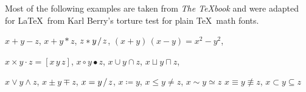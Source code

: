 \documentclass[11pt, a4paper, oneside]{article}
\newcommand*{\divslash}{%
	\mathbin{%
		\nonscript\mskip-2mu / \nonscript\mskip-2mu%
	}%
}  %
\theoremstyle{Plain}
\theoremstyle{Definition}
\theoremstyle{Remark}
\begin{document}
\begin{appendix}
	\def\testloweri{%
	  \test a \test b \test c \test d \test e \test f \test g \test h
	  \test i \test j \test k \test l \test m }
	\def\testlowerii{%
	  \test n \test o \test p \test q \test r \test s \test t \test u
	  \test v \test w \test x \test y \test z }
	\def\testlower{%
	  \testloweri\testlowerii}

	\def\testupgreeki{%
	  \test A \test B \test\Gamma \test\Delta \test E \test Z \test H
	  \test\Theta \test I \test K \test\Lambda \test M }
	\def\testupgreekii{%
	  \test N \test\Xi \test O \test\Pi \test P \test\Sigma \test T
	  \test\Upsilon \test\Phi \test X \test\Psi \test\Omega }
	\def\testupgreek{%
	  \testupgreeki\testupgreekii}

	\def\testlowgreeki{%
	  \test\alpha \test\beta \test\gamma \test\delta \test\epsilon
	  \test\zeta \test\eta \test\theta \test\iota \test\kappa \test\lambda
	  \test\mu }
	\def\testlowgreekii{%
	  \test\nu \test\xi \test o \test\pi \test\rho \test\sigma \test\tau
	  \test\upsilon \test\phi \test\chi \test\psi \test\omega }
	\def\testlowgreekiii{%
	  \test\varepsilon \test\vartheta \test\varpi \test\varrho
	  \test\varsigma \test\varphi}
	\def\testlowgreek{%
	  \testlowgreeki\testlowgreekii\testlowgreekiii}

	\def\testlowgreekupi{%
	  \test\upalpha \test\upbeta \test\upgamma \test\updelta \test\upepsilon
	  \test\upzeta \test\upeta \test\uptheta \test\upiota \test\upkappa \test\uplambda
	  \test\upmu }
	\def\testlowgreekupii{%
	  \test\upnu \test\upxi \test o \test\uppi \test\uprho \test\upsigma \test\uptau
	  \test\upupsilon \test\upphi \test\upchi \test\uppsi \test\upomega }
	\def\testlowgreekupiii{%
	  \test\upvarepsilon \test\upvartheta \test\upvarpi \test\upvarrho
	  \test\upvarsigma \test\upvarphi}
	\def\testlowgreekup{%
	  \testlowgreekupi\testlowgreekupii\testlowgreekupiii}

	\newcommand{\showfamily}{}

	Most of the following examples are taken from \textit{The \TeX book} \citep[][see \url{https://ctan.org/pkg/texbook}]{knuth:ct:a} and were adapted for \LaTeX\ from Karl Berry's torture test for plain \TeX\ math fonts.

	\noindent $x + y - z$, \quad $x + y * z$, \quad $z * y \divslash z$, \quad
	$(x+y)\,(x-y) = x^2 - y^2$,

	\noindent $x \times y \cdot z = [x\, y\, z]$, \quad $x\circ y \bullet z$, \quad
	$x\cup y \cap z$, \quad $x\sqcup y \sqcap z$, \quad

	\noindent $x \vee y \wedge z$, \quad $x\pm y\mp z$, \quad
	$x=y \divslash z$, \;\; $x \coloneqq y$, \;\; $x\le y \ne z$, \;\; $x \sim y \simeq z$
	$x \equiv y \nequiv z$, \;\; $x\subset y \subseteq z$


\end{appendix}
\end{document}
